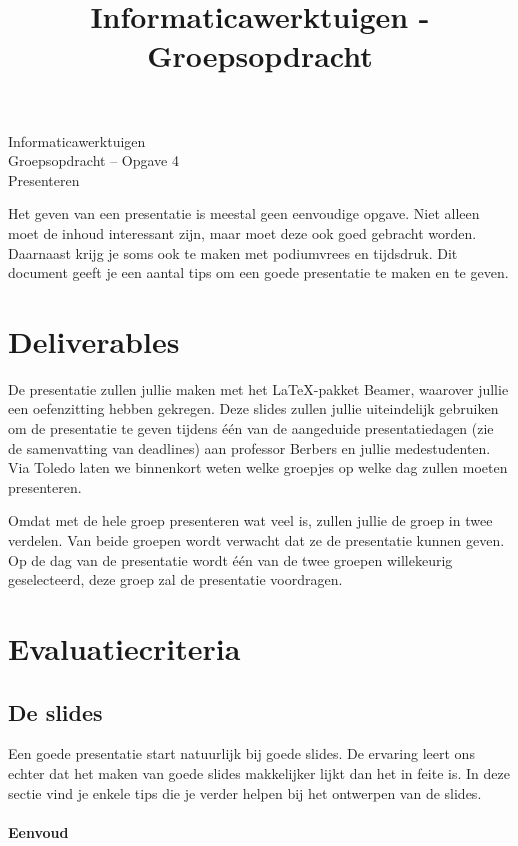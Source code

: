 \documentclass[a4paper]{article}
\title{Informaticawerktuigen - Groepsopdracht}
\begin{document}
\begin{center}
  \huge Informaticawerktuigen \\
  \Huge Groepsopdracht -- Opgave 4 \\
  \huge Presenteren
\end{center}
\vspace{1em}

Het geven van een presentatie is meestal geen eenvoudige opgave.
Niet alleen moet de inhoud interessant zijn, maar moet deze ook goed gebracht worden.
Daarnaast krijg je soms ook te maken met podiumvrees en tijdsdruk.
Dit document geeft je een aantal tips om een goede presentatie te maken en te geven.


\section{Deliverables}

De presentatie zullen jullie maken met het \LaTeX-pakket Beamer, waarover jullie een oefenzitting hebben gekregen.
Deze slides zullen jullie uiteindelijk gebruiken om de presentatie te geven tijdens \'e\'en van de aangeduide presentatiedagen (zie de samenvatting van deadlines) aan professor Berbers en jullie medestudenten.
Via Toledo laten we binnenkort weten welke groepjes op welke dag zullen moeten presenteren.

Omdat met de hele groep presenteren wat veel is, zullen jullie de groep in twee verdelen.
Van beide groepen wordt verwacht dat ze de presentatie kunnen geven.
Op de dag van de presentatie wordt \'e\'en van de twee groepen willekeurig geselecteerd, deze groep zal de presentatie voordragen.


\section{Evaluatiecriteria}

\subsection{De slides}

Een goede presentatie start natuurlijk bij goede slides.
De ervaring leert ons echter dat het maken van goede slides makkelijker lijkt dan het in feite is.
In deze sectie vind je enkele tips die je verder helpen bij het ontwerpen van de slides.


\paragraph{Eenvoud}
\end{document}
